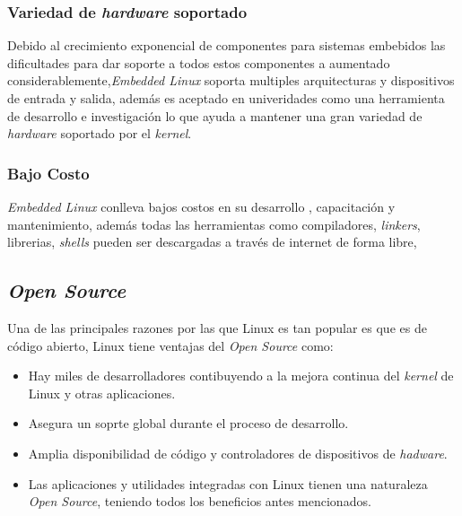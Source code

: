 \subsubsection{Variedad de \emph{hardware} soportado}

Debido al crecimiento exponencial de componentes para sistemas embebidos las
dificultades para dar soporte a todos estos componentes a  aumentado
considerablemente,\emph{Embedded Linux} soporta multiples arquitecturas y
dispositivos de entrada y salida, además es aceptado en univeridades como una
herramienta de desarrollo e investigación lo que ayuda  a mantener una gran
variedad de \emph{hardware} soportado por el \emph{kernel}.

\subsubsection{Bajo Costo}

\emph{Embedded Linux} conlleva bajos costos en su desarrollo , capacitación y
mantenimiento, además todas las herramientas como compiladores, \emph{linkers},
librerias, \emph{shells} pueden ser descargadas a través de internet de forma
libre,

\subsection{\emph{Open Source}}

Una de las principales razones por las que Linux es tan popular es que es de
código abierto, Linux tiene  ventajas del \emph{Open
Source}\cite{raghavan2005embedded} como:
\begin{itemize}
 \item Hay miles de desarrolladores contibuyendo a la mejora continua del
 \emph{kernel} de Linux y otras aplicaciones.
 \item Asegura un soprte global durante el proceso de desarrollo.
 \item Amplia disponibilidad de código  y controladores de dispositivos de
 \emph{hadware}.
 \item Las aplicaciones y utilidades integradas con Linux tienen una naturaleza
\emph{Open Source}, teniendo todos los beneficios antes mencionados. 
\end{itemize}















